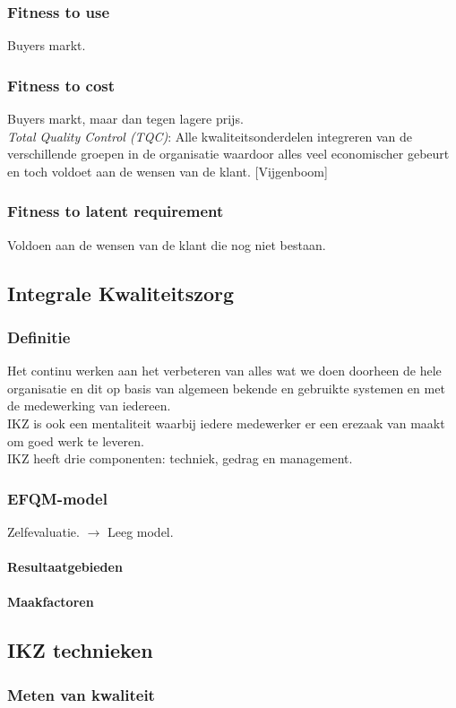 \documentclass[12pt]{article}
\begin{document}
\subsubsection{Fitness to use}
Buyers markt.
\subsubsection{Fitness to cost}
Buyers markt, maar dan tegen lagere prijs.\\
\textit{Total Quality Control (TQC)}: Alle kwaliteitsonderdelen integreren van de verschillende groepen in de organisatie waardoor alles veel economischer gebeurt en toch voldoet aan de wensen van de klant. [Vijgenboom]
\subsubsection{Fitness to latent requirement}
Voldoen aan de wensen van de klant die nog niet bestaan.
\subsection{Integrale Kwaliteitszorg}
\subsubsection{Definitie}
Het continu werken aan het verbeteren van alles wat we doen doorheen de hele organisatie en dit op basis van algemeen bekende en gebruikte systemen en met de medewerking van iedereen.\\
IKZ is ook een mentaliteit waarbij iedere medewerker er een erezaak van maakt om goed werk te leveren.\\
IKZ heeft drie componenten: techniek, gedrag en management.
\subsubsection{EFQM-model}
Zelfevaluatie. $\rightarrow$ Leeg model.
\paragraph{Resultaatgebieden}
\paragraph{Maakfactoren}
\subsection{IKZ technieken}
\subsubsection{Meten van kwaliteit}
\end{document}
